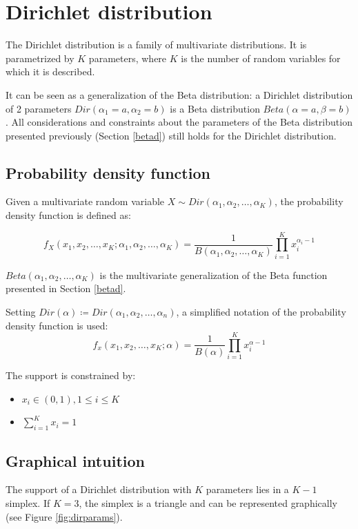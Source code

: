 \section{Dirichlet distribution}
The Dirichlet distribution is a family of multivariate distributions.
It is parametrized by $K$ parameters, where $K$ is the number of random variables for which it is described.

It can be seen as a generalization of the Beta distribution: a Dirichlet distribution of 2 parameters $\mathit{Dir}(\alpha_1=a, \alpha_2=b)$ is a Beta distribution $\mathit{Beta}(\alpha=a, \beta=b)$.
All considerations and constraints about the parameters of the Beta distribution presented previously (Section \ref{betad}) still holds for the Dirichlet distribution.

\subsection{Probability density function}
Given a multivariate random variable $X \sim \mathit{Dir}(\alpha_1, \alpha_2, \dots, \alpha_K)$, the probability density function is defined as:

$$f_{X}(x_1, x_2, \dots, x_K; \alpha_1, \alpha_2, \dots, \alpha_K) = \frac{1}{B(\alpha_1, \alpha_2, \dots, \alpha_K)} \prod_{i=1}^{K} x_i^{\alpha_i - 1}$$

$\mathit{Beta}(\alpha_1, \alpha_2, \dots, \alpha_K)$ is the multivariate generalization of the Beta function presented in Section \ref{betad}.

Setting $\mathit{Dir}(\alpha) \coloneqq \mathit{Dir}(\alpha_1, \alpha_2, \dots, \alpha_n)$, a simplified notation of the probability density function is used:
$$f_{x}(x_1, x_2, \dots, x_K; \alpha) = \frac{1}{B(\alpha)} \prod_{i=1}^{K} x_i^{\alpha - 1}$$

The support is constrained by:
\begin{itemize}
    \item $x_i \in (0, 1), 1 \leq i \leq K $
    \item $\sum_{i=1}^K x_i = 1$
\end{itemize}

\subsection{Graphical intuition}
The support of a Dirichlet distribution with $K$ parameters lies in a $K-1$ simplex.
If $K=3$, the simplex is a triangle and can be represented graphically (see Figure \ref{fig:dirparams}).

